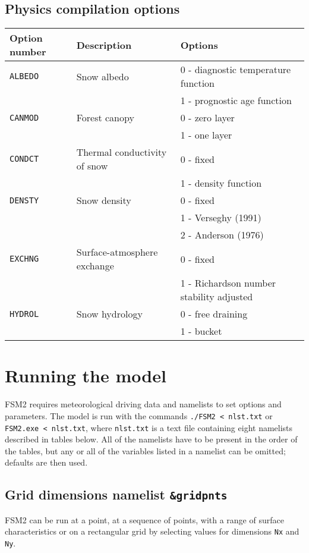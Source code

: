 \documentclass{article}
\begin{document}
\subsection*{Physics compilation options }
\begin{tabular}{|l|l|l|}
\hline
Option number & Description & Options \\
\hline
{\tt ALBEDO} & Snow albedo
& 0 - diagnostic temperature function \\
& & 1 - prognostic age function \\
\hline
{\tt CANMOD} & Forest canopy
& 0 - zero layer \\
& & 1 - one layer \\
\hline
{\tt CONDCT} & Thermal conductivity of snow
& 0 - fixed \\
& & 1 - density function \\
\hline
{\tt DENSTY} & Snow density
& 0 - fixed \\
& & 1 - Verseghy (1991) \\
& & 2 - Anderson (1976) \\
\hline
{\tt EXCHNG} & Surface-atmosphere exchange
& 0 - fixed \\
& & 1 - Richardson number stability adjusted \\
\hline
{\tt HYDROL} & Snow hydrology
& 0 - free draining \\
& & 1 - bucket \\ 
\hline
\end{tabular}

\section{Running the model}

FSM2 requires meteorological driving data and namelists to set options and parameters. The model is run with the commands {\tt ./FSM2 < nlst.txt} or {\tt FSM2.exe < nlst.txt}, where {\tt nlst.txt} is a text file containing eight namelists described in tables below. All of the namelists have to be present in the order of the tables, but any or all of the variables listed in a namelist can be omitted; defaults are then used.


\subsection*{Grid dimensions namelist {\tt \&gridpnts}}
FSM2 can be run at a point, at a sequence of points, with a range of surface characteristics or on a rectangular grid by selecting values for dimensions {\tt Nx} and {\tt Ny}. 
\end{document}
